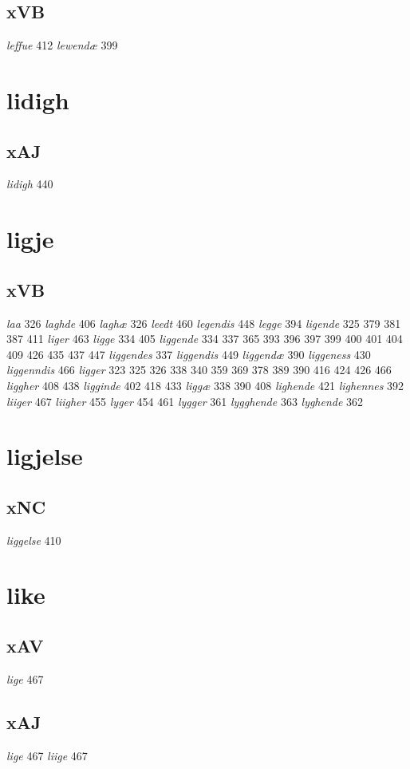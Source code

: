 \documentclass[a4paper,twocolumn]{article}
\begin{document}
\subsection{xVB}
\label{sec:org3f621a5}
\emph{leffue} 412 \emph{lewendæ} 399 
\section{lidigh}
\label{sec:org3b3a1df}
\subsection{xAJ}
\label{sec:org00942ec}
\emph{lidigh} 440 
\section{ligje}
\label{sec:org2815b27}
\subsection{xVB}
\label{sec:org905d9a5}
\emph{laa} 326 \emph{laghde} 406 \emph{laghæ} 326 \emph{leedt} 460 \emph{legendis} 448 \emph{legge} 394 \emph{ligende} 325 379 381 387 411 \emph{liger} 463 \emph{ligge} 334 405 \emph{liggende} 334 337 365 393 396 397 399 400 401 404 409 426 435 437 447 \emph{liggendes} 337 \emph{liggendis} 449 \emph{liggendæ} 390 \emph{liggeness} 430 \emph{liggenndis} 466 \emph{ligger} 323 325 326 338 340 359 369 378 389 390 416 424 426 466 \emph{liggher} 408 438 \emph{ligginde} 402 418 433 \emph{liggæ} 338 390 408 \emph{lighende} 421 \emph{lighennes} 392 \emph{liiger} 467 \emph{liigher} 455 \emph{lyger} 454 461 \emph{lygger} 361 \emph{lygghende} 363 \emph{lyghende} 362 
\section{ligjelse}
\label{sec:orga1b2ff7}
\subsection{xNC}
\label{sec:org3329d2f}
\emph{liggelse} 410 
\section{like}
\label{sec:org4537fde}
\subsection{xAV}
\label{sec:orga4a9d26}
\emph{lige} 467 
\subsection{xAJ}
\label{sec:orga99bd99}
\emph{lige} 467 \emph{liige} 467 
\end{document}
